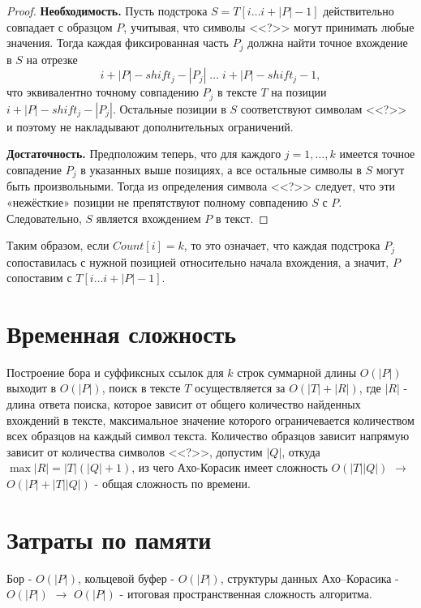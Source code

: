 \documentclass{article}
\begin{document}
\begin{proof}
    \textbf{Необходимость.}
    Пусть подстрока $S = T[i \dots i + |P| - 1]$ действительно совпадает с образцом $P$, учитывая, что символы <<?>> могут принимать любые значения. Тогда каждая фиксированная часть $P_j$ должна найти точное вхождение в $S$ на отрезке
    \[
        i + |P| - shift_j - |P_j|\;\dots\;i + |P| - shift_j - 1,
    \]
    что эквивалентно точному совпадению $P_j$ в тексте $T$ на позиции $i + |P| - shift_j - |P_j|$. Остальные позиции в $S$ соответствуют символам <<?>> и поэтому не накладывают дополнительных ограничений.

    \medskip

    \textbf{Достаточность.}
    Предположим теперь, что для каждого $j=1,\dots,k$ имеется точное совпадение $P_j$ в указанных выше позициях, а все остальные символы в $S$ могут быть произвольными. Тогда из определения символа <<?>> следует, что эти «нежёсткие» позиции не препятствуют полному совпадению $S$ с $P$. Следовательно, $S$ является вхождением $P$ в текст.
\end{proof}

Таким образом, если $Count[i] = k$, то это означает, что каждая подстрока $P_j$ сопоставилась с нужной позицией относительно начала вхождения, а значит, $P$ сопоставим с $T[i \ldots i + |P| - 1]$.

\section{Временная сложность}
Построение бора и суффиксных ссылок для $k$ строк суммарной длины $O(|P|)$ выходит в $O(|P|)$, поиск в тексте $T$ осуществляется за $O(|T| + |R|)$, где $|R|$ - длина ответа поиска, которое зависит от общего количество найденных вхождений в тексте, максимальное значение которого ограничевается количеством всех образцов на каждый символ текста. Количество образцов зависит напрямую зависит от количества символов <<?>>, допустим $|Q|$, откуда $\max{|R|}= |T| (|Q| + 1)$, из чего Ахо-Корасик имеет сложность $O(|T||Q|)$ $\to$ $O(|P| + |T||Q|)$ - общая сложность по времени.

\section{Затраты по памяти}
Бор - $O(|P|)$, кольцевой буфер - $O(|P|)$, структуры данных Ахо–Корасика - $O(|P|)$ $\to$ $O(|P|)$ - итоговая пространственная сложность алгоритма.
\end{document}
